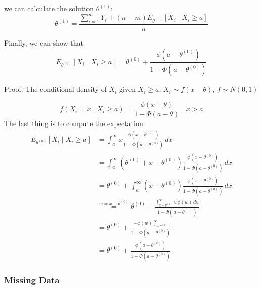 \documentclass[
  14pt,
]{article}
\begin{document}
we can calculate the solution \(\theta^{(1)}\): \[
\theta^{(1)}=\frac{\sum\limits_{i=1}^{m}Y_i+(n-m)E_{\theta^{(0)}}[X_i\mid X_i\ge a]}{n}
\]

Finally, we can show that \[
E_{\theta^{(0)}}[X_i\mid X_i\ge a]=\theta^{(0)}+\frac{\phi(a-\theta^{(0)})}{1-\Phi(a-\theta^{(0)})}
\]

\begin{mdframed}
Proof: 
The conditional density of $X_i$ given $X_i\ge a$, $X_i \sim f(x-\theta)$, $f\sim N(0,1)$

$$
f(X_i=x\mid X_i\ge a)=\frac{\phi(x-\theta)}{1-\Phi(a-\theta)}\ \ \ \ x>a
$$
The last thing is to compute the expectation. 
$$
\begin{aligned}
E_{\theta^{(0)}}[X_i\mid X_i\ge a]&=\int_{a}^{\infty}x\frac{\phi(x-\theta^{(0)})}{1-\Phi(a-\theta^{(0)})}\,dx\\
&=\int_{a}^{\infty}(\theta^{(0)}+x-\theta^{(0)})\frac{\phi(x-\theta^{(0)})}{1-\Phi(a-\theta^{(0)})}\,dx\\
&=\theta^{(0)}+\int_{a}^{\infty}(x-\theta^{(0)})\frac{\phi(x-\theta^{(0)})}{1-\Phi(a-\theta^{(0)})}\,dx\\
&\overset{w=x-\theta^{(0)}}{=}\theta^{(0)}+\frac{\int_{a-\theta^{(0)}}^{\infty}w\phi(w)\,dw}{1-\Phi(a-\theta^{(0)})}\\
&=\theta^{(0)}+\frac{-\phi(w)\Big|_{a-\theta^{(0)}}^{\infty}}{1-\Phi(a-\theta^{(0)})}\\
&=\theta^{(0)}+\frac{\phi(a-\theta^{(0)})}{1-\Phi(a-\theta^{(0)})}
\end{aligned}
$$
\end{mdframed}

\hypertarget{missing-data}{%
\subsubsection{Missing Data}\label{missing-data}}
\end{document}
